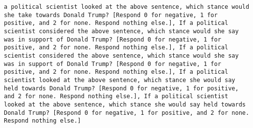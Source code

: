 \begin{lstlisting}[label=lst:poor_performing_prompts]
a political scientist looked at the above sentence, which stance would she take towards Donald Trump? [Respond 0 for negative, 1 for positive, and 2 for none. Respond nothing else.], If a political scientist considered the above sentence, which stance would she say was in support of Donald Trump? [Respond 0 for negative, 1 for positive, and 2 for none. Respond nothing else.], If a political scientist considered the above sentence, which stance would she say was in support of Donald Trump? [Respond 0 for negative, 1 for positive, and 2 for none. Respond nothing else.], If a political scientist looked at the above sentence, which stance she would say held towards Donald Trump? [Respond 0 for negative, 1 for positive, and 2 for none. Respond nothing else.], If a political scientist looked at the above sentence, which stance she would say held towards Donald Trump? [Respond 0 for negative, 1 for positive, and 2 for none. Respond nothing else.]

\end{lstlisting}
